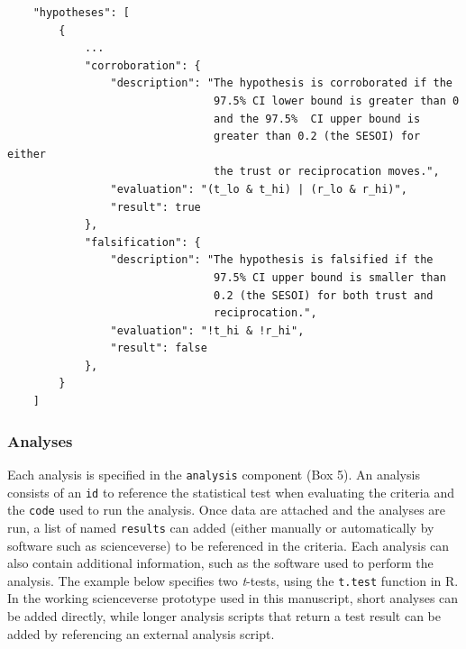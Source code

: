 \documentclass[
  english,
  doc,floatsintext]{apa6}
\begin{document}
\begin{tcolorbox}[colback=black!5!white,colframe=white!5!black,title=Box 4. Corroboration and falsification rules.]
\begin{verbatim}
    "hypotheses": [
        {
            ...
            "corroboration": {
                "description": "The hypothesis is corroborated if the 
                                97.5% CI lower bound is greater than 0 
                                and the 97.5%  CI upper bound is 
                                greater than 0.2 (the SESOI) for either 
                                the trust or reciprocation moves.",
                "evaluation": "(t_lo & t_hi) | (r_lo & r_hi)",
                "result": true
            },
            "falsification": {
                "description": "The hypothesis is falsified if the 
                                97.5% CI upper bound is smaller than 
                                0.2 (the SESOI) for both trust and 
                                reciprocation.",
                "evaluation": "!t_hi & !r_hi",
                "result": false
            },
        }
    ]
\end{verbatim}
\end{tcolorbox}

\hypertarget{analyses}{%
\subsubsection{Analyses}\label{analyses}}

Each analysis is specified in the \texttt{analysis} component (Box 5). An analysis consists of an \texttt{id} to reference the statistical test when evaluating the criteria and the \texttt{code} used to run the analysis. Once data are attached and the analyses are run, a list of named \texttt{results} can added (either manually or automatically by software such as scienceverse) to be referenced in the criteria. Each analysis can also contain additional information, such as the software used to perform the analysis. The example below specifies two \emph{t}-tests, using the \texttt{t.test} function in R. In the working scienceverse prototype used in this manuscript, short analyses can be added directly, while longer analysis scripts that return a test result can be added by referencing an external analysis script.
\end{document}
